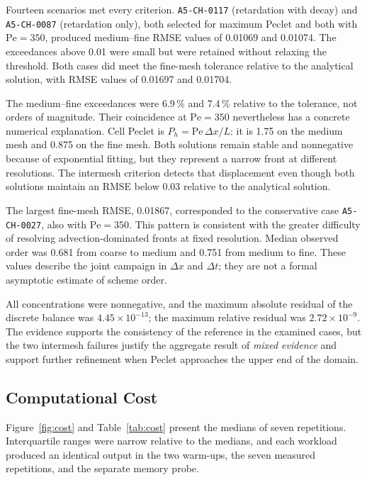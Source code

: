 \documentclass[11pt,a4paper]{article}
\newcommand{\code}[1]{\texttt{#1}}
\begin{document}
Fourteen scenarios met every criterion. \code{A5-CH-0117} (retardation with
decay) and \code{A5-CH-0087} (retardation only), both selected for maximum
Peclet and both with $\mathrm{Pe}=350$, produced medium--fine RMSE values of
0.01069 and 0.01074. The exceedances above 0.01 were small but were retained
without relaxing the threshold. Both cases did meet the fine-mesh tolerance
relative to the analytical solution, with RMSE values of 0.01697 and 0.01704.

The medium--fine exceedances were 6.9\,\% and 7.4\,\% relative to the tolerance,
not orders of magnitude. Their coincidence at $\mathrm{Pe}=350$ nevertheless
has a concrete numerical explanation. Cell Peclet is
$P_h=\mathrm{Pe}\,\Delta x/L$: it is 1.75 on the medium mesh and 0.875 on the
fine mesh. Both solutions remain stable and nonnegative because of exponential
fitting, but they represent a narrow front at different resolutions. The
intermesh criterion detects that displacement even though both solutions
maintain an RMSE below 0.03 relative to the analytical solution.

The largest fine-mesh RMSE, 0.01867, corresponded to the conservative case
\code{A5-CH-0027}, also with $\mathrm{Pe}=350$. This pattern is consistent with
the greater difficulty of resolving advection-dominated fronts at fixed
resolution. Median observed order was 0.681 from coarse to medium and 0.751
from medium to fine. These values describe the joint campaign in $\Delta x$
and $\Delta t$; they are not a formal asymptotic estimate of scheme order.

All concentrations were nonnegative, and the maximum absolute residual of the
discrete balance was $4.45\times10^{-13}$; the maximum relative residual was
$2.72\times10^{-9}$. The evidence supports the consistency of the reference in
the examined cases, but the two intermesh failures justify the aggregate
result of \emph{mixed evidence} and support further refinement when Peclet
approaches the upper end of the domain.

\subsection{Computational Cost}

Figure~\ref{fig:cost} and Table~\ref{tab:cost} present the medians of seven
repetitions. Interquartile ranges were narrow relative to the medians, and each
workload produced an identical output in the two warm-ups, the seven measured
repetitions, and the separate memory probe.
\end{document}
